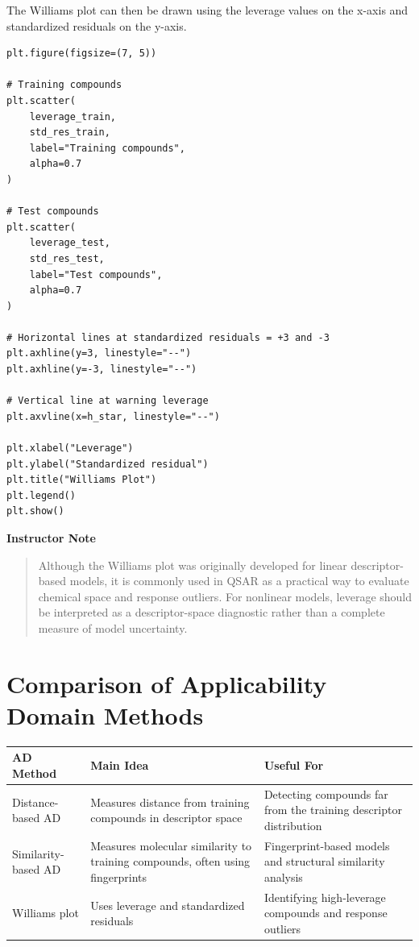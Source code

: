 \documentclass[11pt]{report}
\newenvironment{Important note}{\begin{quote}\color{red}\textbf{Important note:} }{\end{quote}}
\newenvironment{instructornote}
{\vspace{0.5em}\noindent\textbf{Instructor Note}\begin{quote}}
{\end{quote}\vspace{0.5em}}
\begin{document}
The Williams plot can then be drawn using the leverage values on the x-axis and standardized residuals on the y-axis.

\begin{lstlisting}[style=pythonstyle, caption={Drawing a Williams plot.}]
plt.figure(figsize=(7, 5))

# Training compounds
plt.scatter(
    leverage_train,
    std_res_train,
    label="Training compounds",
    alpha=0.7
)

# Test compounds
plt.scatter(
    leverage_test,
    std_res_test,
    label="Test compounds",
    alpha=0.7
)

# Horizontal lines at standardized residuals = +3 and -3
plt.axhline(y=3, linestyle="--")
plt.axhline(y=-3, linestyle="--")

# Vertical line at warning leverage
plt.axvline(x=h_star, linestyle="--")

plt.xlabel("Leverage")
plt.ylabel("Standardized residual")
plt.title("Williams Plot")
plt.legend()
plt.show()
\end{lstlisting}

\begin{instructornote}
Although the Williams plot was originally developed for linear descriptor-based models, it is commonly used in QSAR as a practical way to evaluate chemical space and response outliers. For nonlinear models, leverage should be interpreted as a descriptor-space diagnostic rather than a complete measure of model uncertainty.
\end{instructornote}

\section{Comparison of Applicability Domain Methods}

\begin{center}
\begin{tabular}{p{}p{}p{}}
\toprule
\textbf{AD Method} & \textbf{Main Idea} & \textbf{Useful For} \\
\midrule
Distance-based AD & Measures distance from training compounds in descriptor space & Detecting compounds far from the training descriptor distribution \\
Similarity-based AD & Measures molecular similarity to training compounds, often using fingerprints & Fingerprint-based models and structural similarity analysis \\
Williams plot & Uses leverage and standardized residuals & Identifying high-leverage compounds and response outliers \\
\bottomrule
\end{tabular}
\end{center}
\end{document}
